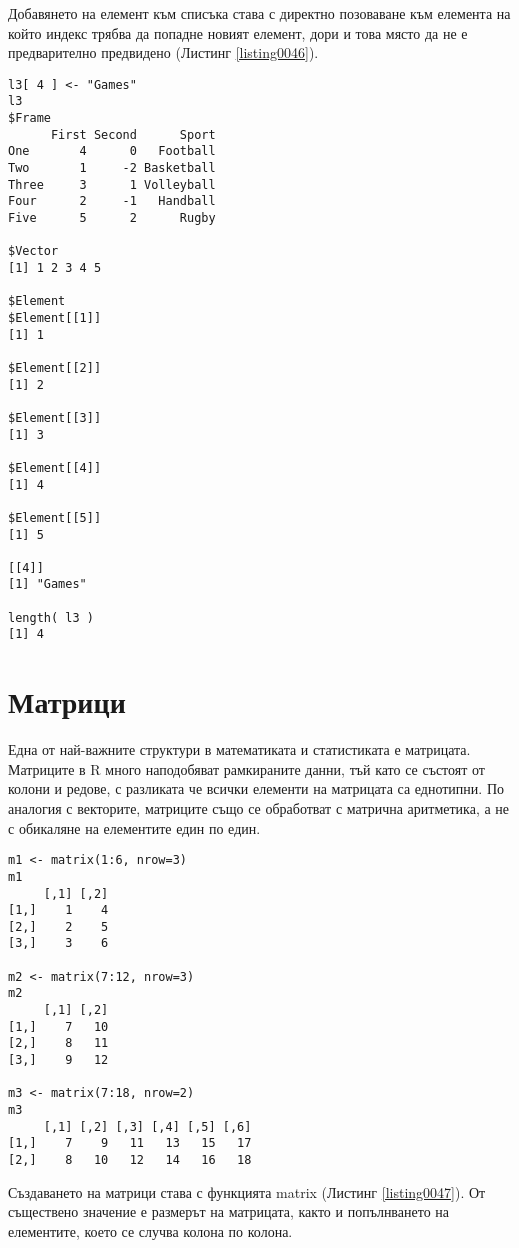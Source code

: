 Добавянето на елемент към списъка става с директно позоваване към елемента на който индекс трябва да попадне новият елемент, дори и това място да не е предварително предвидено (Листинг \ref{listing0046}).

\begin{lstlisting}[caption=Добавяне на елемент, label=listing0046]
l3[ 4 ] <- "Games"
l3
$Frame
      First Second      Sport
One       4      0   Football
Two       1     -2 Basketball
Three     3      1 Volleyball
Four      2     -1   Handball
Five      5      2      Rugby

$Vector
[1] 1 2 3 4 5

$Element
$Element[[1]]
[1] 1

$Element[[2]]
[1] 2

$Element[[3]]
[1] 3

$Element[[4]]
[1] 4

$Element[[5]]
[1] 5

[[4]]
[1] "Games"

length( l3 )
[1] 4
\end{lstlisting}

\section{Матрици}

Една от най-важните структури в математиката и статистиката е матрицата. Матриците в R много наподобяват рамкираните данни, тъй като се състоят от колони и редове, с разликата че всички елементи на матрицата са еднотипни. По аналогия с векторите, матриците също се обработват с матрична аритметика, а не с обикаляне на елементите един по един. 

\begin{lstlisting}[caption=Създаване на матрици, label=listing0047]
m1 <- matrix(1:6, nrow=3)
m1
     [,1] [,2]
[1,]    1    4
[2,]    2    5
[3,]    3    6

m2 <- matrix(7:12, nrow=3)
m2
     [,1] [,2]
[1,]    7   10
[2,]    8   11
[3,]    9   12

m3 <- matrix(7:18, nrow=2)
m3
     [,1] [,2] [,3] [,4] [,5] [,6]
[1,]    7    9   11   13   15   17
[2,]    8   10   12   14   16   18
\end{lstlisting}

Създаването на матрици става с функцията matrix (Листинг \ref{listing0047}). От съществено значение е размерът на матрицата, както и попълнването на елементите, което се случва колона по колона. 

